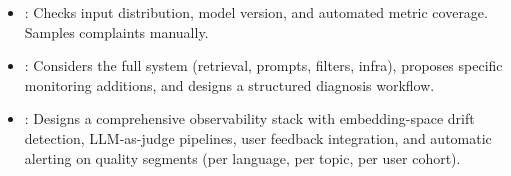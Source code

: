 \begin{interviewq}

\goodgreat
\begin{itemize}
    \item {}: Checks input distribution, model version, and automated
          metric coverage.  Samples complaints manually.
    \item {}: Considers the full system (retrieval, prompts, filters, infra),
          proposes specific monitoring additions, and designs a structured diagnosis
          workflow.
    \item {}: Designs a comprehensive observability stack with
          embedding-space drift detection, LLM-as-judge pipelines, user feedback
          integration, and automatic alerting on quality segments (per language,
          per topic, per user cohort).
\end{itemize}

\end{interviewq}

\vspace{0.5em}

